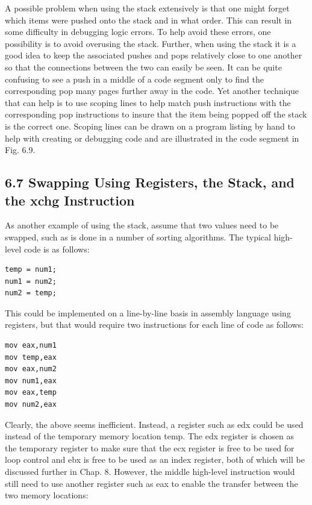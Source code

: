 \documentclass[10pt]{book}
\begin{document}
\begin{center}
\begin{center}
A possible problem when using the stack extensively is that one might forget which items were pushed onto the stack and in what order. This can result in some difficulty in debugging logic errors. To help avoid these errors, one possibility is to avoid overusing the stack. Further, when using the stack it is a good idea to keep the associated pushes and pops relatively close to one another so that the connections between the two can easily be seen. It can be quite confusing to see a push in a middle of a code segment only to find the corresponding pop many pages further away in the code. Yet another technique that can help is to use scoping lines to help match push instructions with the corresponding pop instructions to insure that the item being popped off the stack is the correct one. Scoping lines can be drawn on a program listing by hand to help with creating or debugging code and are illustrated in the code segment in Fig. 6.9.

\subsection*{6.7 Swapping Using Registers, the Stack, and the xchg Instruction}
As another example of using the stack, assume that two values need to be swapped, such as is done in a number of sorting algorithms. The typical high-level code is as follows:

\begin{verbatim}
temp = num1;
num1 = num2;
num2 = temp;
\end{verbatim}

This could be implemented on a line-by-line basis in assembly language using registers, but that would require two instructions for each line of code as follows:

\begin{verbatim}
mov eax,num1
mov temp,eax
mov eax,num2
mov num1,eax
mov eax,temp
mov num2,eax
\end{verbatim}

Clearly, the above seems inefficient. Instead, a register such as edx could be used instead of the temporary memory location temp. The edx register is chosen as the temporary register to make sure that the ecx register is free to be used for loop control and ebx is free to be used as an index register, both of which will be discussed further in Chap. 8. However, the middle high-level instruction would still need to use another register such as eax to enable the transfer between the two memory locations:



\end{center}
\end{center}
\end{document}
